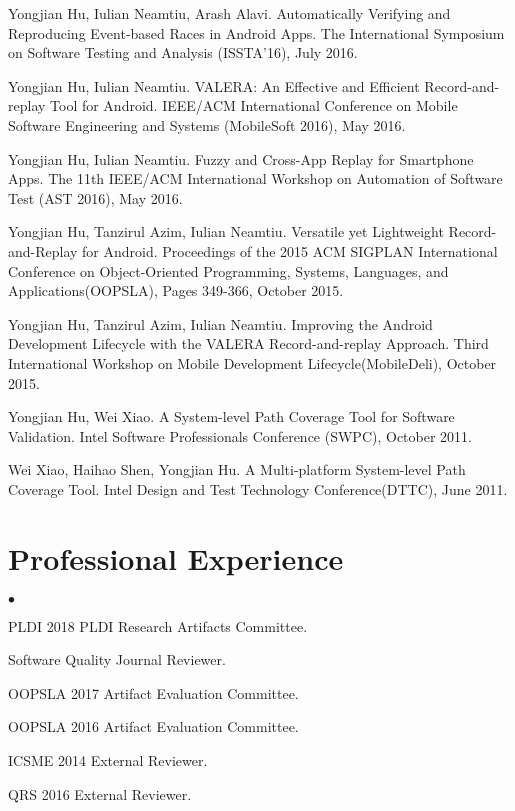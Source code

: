 \documentclass[margin,line]{res}
\newenvironment{list2}{
  \begin{list}{$\bullet$}{%
      \setlength{\itemsep}{0in}
      \setlength{\parsep}{0in} \setlength{\parskip}{0in}
      \setlength{\topsep}{0in} \setlength{\partopsep}{0in} 
      \setlength{\leftmargin}{0.2in}}}{\end{list}}
\begin{document}
\begin{resume}
Yongjian Hu, Iulian Neamtiu, Arash Alavi. Automatically Verifying and Reproducing Event-based Races in Android Apps.
The International Symposium on Software Testing and Analysis (ISSTA'16), July 2016.

Yongjian Hu, Iulian Neamtiu. VALERA: An Effective and Efficient Record-and-replay Tool for Android.
IEEE/ACM International Conference on Mobile Software Engineering and Systems (MobileSoft 2016), May 2016.

Yongjian Hu, Iulian Neamtiu. Fuzzy and Cross-App Replay for Smartphone Apps.
The 11th IEEE/ACM International Workshop on Automation of Software Test (AST 2016), May 2016.

Yongjian Hu, Tanzirul Azim, Iulian Neamtiu. Versatile yet Lightweight Record-and-Replay for Android.
Proceedings of the 2015 ACM SIGPLAN International Conference on Object-Oriented Programming, Systems, Languages, and Applications(OOPSLA),
Pages 349-366, October 2015.

Yongjian Hu, Tanzirul Azim, Iulian Neamtiu. Improving the Android Development Lifecycle with the VALERA Record-and-replay Approach.
Third International Workshop on Mobile Development Lifecycle(MobileDeli), October 2015.


Yongjian Hu, Wei Xiao. A System-level Path Coverage Tool for Software Validation.
Intel Software Professionals Conference (SWPC), October 2011.

Wei Xiao, Haihao Shen, Yongjian Hu. A Multi-platform System-level Path Coverage Tool.
Intel Design and Test Technology Conference(DTTC), June 2011.






\section{\sc Professional Experience}
\begin{list2}
\item PLDI 2018 PLDI Research Artifacts Committee.
\item Software Quality Journal Reviewer.
\item OOPSLA 2017 Artifact Evaluation Committee.
\item OOPSLA 2016 Artifact Evaluation Committee.
\item ICSME 2014 External Reviewer.
\item QRS 2016 External Reviewer.
\end{list2}


\end{resume}
\end{document}
